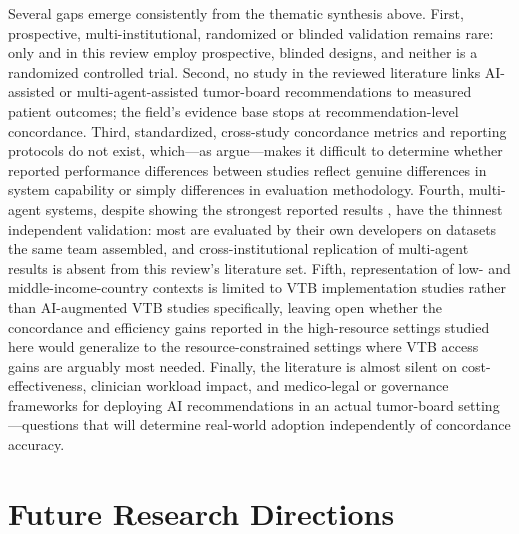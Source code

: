 \documentclass{article}
\begin{document}
Several gaps emerge consistently from the thematic synthesis above. First, prospective, multi-institutional, randomized or blinded validation remains rare: only \citet{pinninti2026} and \citet{seshachalam2026} in this review employ prospective, blinded designs, and neither is a randomized controlled trial. Second, no study in the reviewed literature links AI-assisted or multi-agent-assisted tumor-board recommendations to measured patient outcomes; the field's evidence base stops at recommendation-level concordance. Third, standardized, cross-study concordance metrics and reporting protocols do not exist, which---as \citet{carl2024} argue---makes it difficult to determine whether reported performance differences between studies reflect genuine differences in system capability or simply differences in evaluation methodology. Fourth, multi-agent systems, despite showing the strongest reported results \cite{liu2026}, have the thinnest independent validation: most are evaluated by their own developers on datasets the same team assembled, and cross-institutional replication of multi-agent results is absent from this review's literature set. Fifth, representation of low- and middle-income-country contexts is limited to VTB implementation studies \cite{thiagarajan2023} rather than AI-augmented VTB studies specifically, leaving open whether the concordance and efficiency gains reported in the high-resource settings studied here would generalize to the resource-constrained settings where VTB access gains are arguably most needed. Finally, the literature is almost silent on cost-effectiveness, clinician workload impact, and medico-legal or governance frameworks for deploying AI recommendations in an actual tumor-board setting---questions that will determine real-world adoption independently of concordance accuracy.

\section{Future Research Directions}
\label{sec:future}
\end{document}

